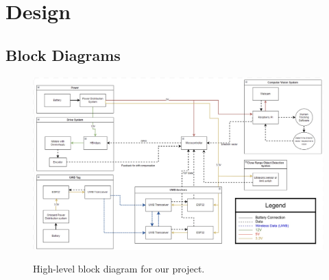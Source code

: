 \documentclass[journal,onecolumn, draftclsnofoot, 12pt]{IEEEtran}
\begin{document}
\newpage

\section{Design}
\subsection{Block Diagrams}

\begin{figure}[H]
\begin{center}
\includegraphics[width=1.0\textwidth]{BlockDiagram.png}\\
\caption{High-level block diagram for our project.  } 
\label{fig:blockdiagram}
\end{center}
\end{figure}
\end{document}
